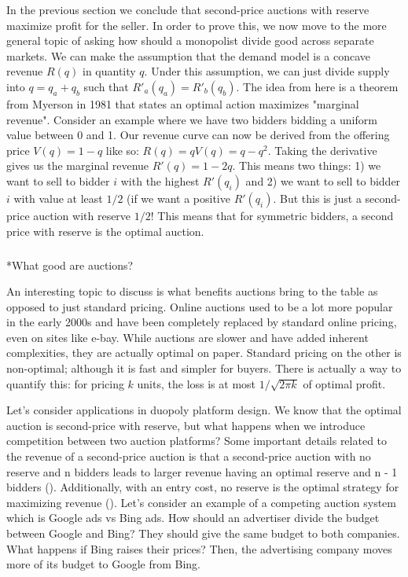 \documentclass[
  letterpaper,
  numbers=noenddot,
  DIV=11]{scrreprt}
\makeatletter
\let\oldsubparagraph\subparagraph
\renewcommand{\subparagraph}{
    \@ifstar
      \xxxSubParagraphStar
      \xxxSubParagraphNoStar
  }
\newcommand{\xxxSubParagraphStar}[1]{\oldsubparagraph*{#1}\mbox{}}
\newcommand{\xxxSubParagraphNoStar}[1]{\oldsubparagraph{#1}\mbox{}}
\theoremstyle{definition}
\theoremstyle{plain}
\theoremstyle{plain}
\theoremstyle{remark}
\makeatother
\begin{document}
In the previous section we conclude that second-price auctions with
reserve maximize profit for the seller. In order to prove this, we now
move to the more general topic of asking how should a monopolist divide
good across separate markets. We can make the assumption that the demand
model is a concave revenue \(R(q)\) in quantity \(q\). Under this
assumption, we can just divide supply into \(q = q_a + q_b\) such that
\(R'_a(q_a) = R'_b(q_b)\). The idea from here is a theorem from Myerson
in 1981 that states an optimal action maximizes "marginal revenue".
Consider an example where we have two bidders bidding a uniform value
between 0 and 1. Our revenue curve can now be derived from the offering
price \(V(q) = 1 - q\) like so: \(R(q) = qV(q) = q - q^2\). Taking the
derivative gives us the marginal revenue \(R'(q) = 1-2q\). This means
two things: 1) we want to sell to bidder \(i\) with the highest
\(R'(q_i)\) and 2) we want to sell to bidder \(i\) with value at least
\(1/2\) (if we want a positive \(R'(q_i)\). But this is just a
second-price auction with reserve \(1/2\)! This means that for symmetric
bidders, a second price with reserve is the optimal auction.

\subparagraph*{What good are auctions?}\label{what-good-are-auctions}

An interesting topic to discuss is what benefits auctions bring to the
table as opposed to just standard pricing. Online auctions used to be a
lot more popular in the early 2000s and have been completely replaced by
standard online pricing, even on sites like e-bay. While auctions are
slower and have added inherent complexities, they are actually optimal
on paper. Standard pricing on the other is non-optimal; although it is
fast and simpler for buyers. There is actually a way to quantify this:
for pricing \(k\) units, the loss is at most \(1 / \sqrt{2\pi k}\) of
optimal profit.

Let's consider applications in duopoly platform design. We know that the
optimal auction is second-price with reserve, but what happens when we
introduce competition between two auction platforms? Some important
details related to the revenue of a second-price auction is that a
second-price auction with no reserve and n bidders leads to larger
revenue having an optimal reserve and n - 1 bidders
().
Additionally, with an entry cost, no reserve is the optimal strategy for
maximizing revenue ().
Let's consider an example of a competing auction system which is Google
ads vs Bing ads. How should an advertiser divide the budget between
Google and Bing? They should give the same budget to both companies.
What happens if Bing raises their prices? Then, the advertising company
moves more of its budget to Google from Bing.
\end{document}
